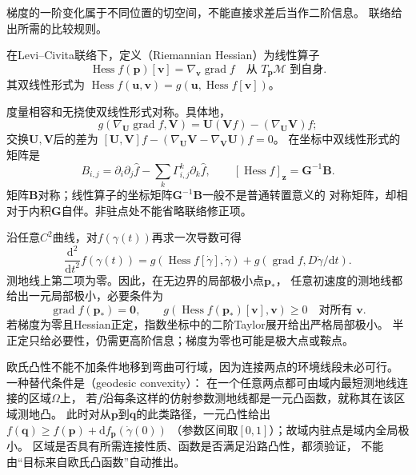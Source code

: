 梯度的一阶变化属于不同位置的切空间，不能直接求差后当作二阶信息。
联络给出所需的比较规则。
\begin{definition}
\label{def:geometry-riemannian-hessian}
在Levi--Civita联络下，定义（Riemannian Hessian）为线性算子
\[
 \operatorname{Hess}f(\bm p)[\bm v]
 =\nabla_{\bm v}\operatorname{grad}f
 \quad\text{从 }T_{\bm p}\mathcal M\text{ 到自身}.
\]
其双线性形式为
$\operatorname{Hess}f(\bm u,\bm v)
=g(\bm u,\operatorname{Hess}f[\bm v])$。
\end{definition}
度量相容和无挠使双线性形式对称。具体地，
\[
 g(\nabla_{\bm U}\operatorname{grad}f,\bm V)
 =\bm U(\bm V f)-(\nabla_{\bm U}\bm V)f;
\]
交换$\bm U,\bm V$后的差为
$[\bm U,\bm V]f-(\nabla_{\bm U}\bm V-\nabla_{\bm V}\bm U)f=0$。
在坐标中双线性形式的矩阵是
\begin{equation}
 B_{i,j}=\partial_i\partial_j\widehat f
             -\sum_k\Gamma^k_{i,j}\partial_k\widehat f,
 \qquad [\operatorname{Hess}f]_{\bm z}=\bm G^{-1}\bm B.
 \label{eq:geometry-hessian-coordinates}
\end{equation}
矩阵$\bm B$对称；线性算子的坐标矩阵$\bm G^{-1}\bm B$一般不是普通转置意义的
对称矩阵，却相对于内积$\bm G$自伴。非驻点处不能省略联络修正项。

沿任意$C^2$曲线，对$f(\gamma(t))$再求一次导数可得
\begin{equation}
 \frac{\mathrm d^2}{\mathrm dt^2}f(\gamma(t))
 =g(\operatorname{Hess}f[\dot\gamma],\dot\gamma)
   +g(\operatorname{grad}f,D\dot\gamma/\mathrm dt).
 \label{eq:geometry-function-second-derivative}
\end{equation}
测地线上第二项为零。因此，在无边界的局部极小点$\bm p_*$，
任意初速度的测地线都给出一元局部极小，必要条件为
\[
 \operatorname{grad}f(\bm p_*)=\bm0,\qquad
 g(\operatorname{Hess}f(\bm p_*)[\bm v],\bm v)\geq0
 \quad\text{对所有 }\bm v.
\]
若梯度为零且Hessian正定，指数坐标中的二阶Taylor展开给出严格局部极小。
半正定只给必要性，仍需更高阶信息；梯度为零也可能是极大点或鞍点。

欧氏凸性不能不加条件地移到弯曲可行域，因为连接两点的环境线段未必可行。
一种替代条件是（geodesic convexity）：
在一个任意两点都可由域内最短测地线连接的区域$\Omega$上，
若$f$沿每条这样的仿射参数测地线都是一元凸函数，就称其在该区域测地凸。
此时对从$\bm p$到$\bm q$的此类路径，一元凸性给出
$f(\bm q)\geq f(\bm p)+\mathrm df_{\bm p}(\dot\gamma(0))$
（参数区间取$[0,1]$）；故域内驻点是域内全局极小。
区域是否具有所需连接性质、函数是否满足沿路凸性，都须验证，
不能由“目标来自欧氏凸函数”自动推出。

